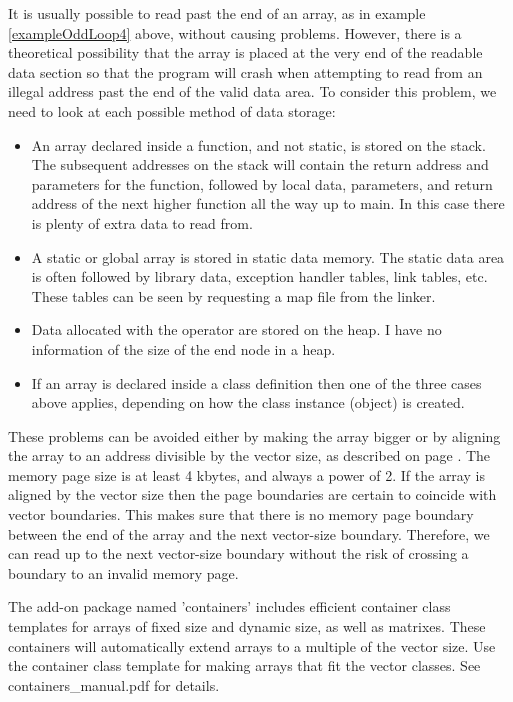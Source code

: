 \documentclass[vcl_manual.tex]{subfiles}
\begin{document}
It is usually possible to read past the end of an array, as in example \ref{exampleOddLoop4} above, without causing problems. However, there is a theoretical possibility that the array is placed at the very end of the readable data section so that the program will crash when attempting to read from an illegal address past the end of the valid data area. To consider this problem, we need to look at each possible method of data storage:
\begin{itemize}
  \item An array declared inside a function, and not static, is stored on the stack. The subsequent addresses on the stack will contain the return address and parameters for the function, followed by local data, parameters, and return address of the next higher function all the way up to main. In this case there is plenty of extra data to read from. 
  \item A static or global array is stored in static data memory. The static data area is often followed by library data, exception handler tables, link tables, etc. These tables can be seen by requesting a map file from the linker. 
  \item Data allocated with the operator  are stored on the heap. I have no information of the size of the end node in a heap.
  \item If an array is declared inside a class definition then one of the three cases above applies, depending on how the class instance (object) is created.
\end{itemize}

These problems can be avoided either by making the array bigger or by aligning the array to an address divisible by the vector size, as described on page \pageref{Alignment}. The memory page size is at least 4 kbytes, and always a power of 2. If the array is aligned by the vector size then the page boundaries are certain to coincide with vector boundaries. This makes sure that there is no memory page boundary between the end of the array and the next vector-size boundary. Therefore, we can read up to the next vector-size boundary without the risk of crossing a boundary to an invalid memory page.

The add-on package named 'containers' includes efficient container class templates for arrays of fixed size and dynamic size, as well as matrixes. 
These containers will automatically extend arrays to a multiple of the vector size. 
Use the container class template  for making arrays that fit the vector classes. See containers\_manual.pdf for details.
\end{document}
